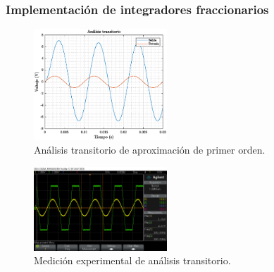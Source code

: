 \documentclass[10pt]{beamer}
\begin{document}
\begin{frame}
		\frametitle{Implementación de integradores fraccionarios}
		\begin{minipage}[t]{0.45\textwidth}
			\begin{figure}[!ht]
		\caption{Análisis transitorio de aproximación de primer orden.} 
		\label{fig:V14_analisis_transitorio}
		\centering
		\includegraphics[width=5cm]{../imagenes/V14_analisis_transitorio.eps}
	\end{figure}
		\end{minipage} \hfill \begin{minipage}[t]{0.45\textwidth}
			\begin{figure}[!ht]
		\caption{Medición experimental de análisis transitorio.} 
		\label{fig:V15_transitorio_real}
		\centering
		\includegraphics[width=5cm]{../imagenes/V15_transitorio_real.png}
	\end{figure}
		\end{minipage}
	\end{frame}
\end{document}
